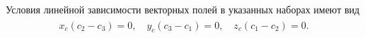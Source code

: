 \begin{frame}[shrink=10]
Условия линейной зависимости векторных полей в указанных наборах имеют вид
\begin{gather*}
\begin{gathered}
x_c(c_2 - c_3) = 0,\quad
y_c(c_3-c_1) = 0, \quad
z_c(c_1-c_2) = 0.
\end{gathered}
\end{gather*}


\end{frame}

%
%
%
%
